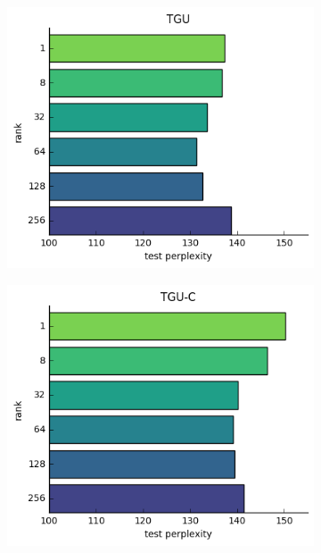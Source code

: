 \begin{figure}[ht]
\begin{subfigure}[t]{0.45\textwidth}
	\includegraphics[width=\textwidth]{exps/ptb/tgu-rank}
\end{subfigure}\hfill
\begin{subfigure}[t]{0.45\textwidth}
	\includegraphics[width=\textwidth]{exps/ptb/tguc-rank}
\end{subfigure}\\
\begin{subfigure}[t]{0.45\textwidth}

\end{subfigure}
\end{figure}
